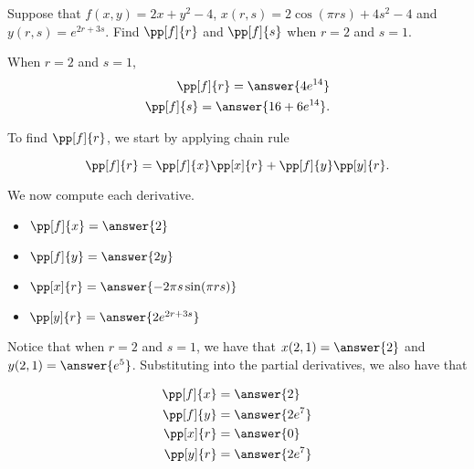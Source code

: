 \documentclass{ximera}
\author{Jim Talamo}
\begin{document}
\begin{exercise}

Suppose that $f(x,y)= 2x+y^2-4$, $x(r,s)=2\cos(\pi rs)+4s^2-4$ and $y(r,s) = e^{2r+3s}$.  Find $\pp[f]{r}$ and $\pp[f]{s}$ when $r=2 $ and $s=1$.

When $r=2$ and $s=1$, 
\begin{align*}
\pp[f]{r} = \answer{4e^{14}} \\
\pp[f]{s} = \answer{16+6e^{14} } .
\end{align*}

\begin{hint}
To find $\pp[f]{r}$, we start by applying chain rule

\[
\pp[f]{r} = \pp[f]{x}\pp[x]{r} + \pp[f]{y}\pp[y]{r}.
\]

We now compute each derivative.

\begin{itemize}
\item $\pp[f]{x} = \answer{2}$
\item $\pp[f]{y} = \answer{2y}$ 
\item $\pp[x]{r} = \answer{- 2 \pi s \sin(\pi rs)} $ 
\item $\pp[y]{r} = \answer{2e^{2r+3s}}$
\end{itemize}

Notice that when $r=2$ and $s=1$, we have that $x(2,1) = \answer{2}$ and $y(2,1) = \answer{e^5}$.  Substituting into the partial derivatives, we also have that 

\begin{align*}
\pp[f]{x} &= \answer{2} \\
\pp[f]{y} &= \answer{2e^7} \\
\pp[x]{r} &= \answer{0} \\
\pp[y]{r} &= \answer{2e^7}
\end{align*}
\end{hint}

\end{exercise}
\end{document}
